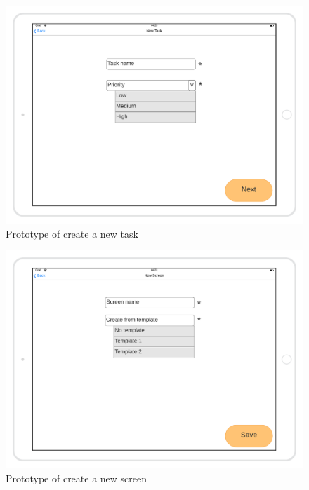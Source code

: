 \begin{figure}[H]
    \includegraphics[width=\textwidth]{images/Create-new-task-mockup.png}
    \caption{Prototype of create a new task}
\end{figure}

\begin{figure}[H]
    \includegraphics[width=\textwidth]{images/Create-new-screen-mockup.png}
    \caption{Prototype of create a new screen}
\end{figure}

